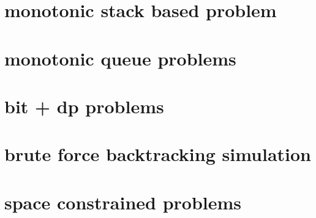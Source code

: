 \chapter{monotonic stack based problem}
\chapter{monotonic queue problems}
\chapter{bit + dp problems}
\chapter{brute force backtracking simulation}
\chapter{space constrained problems}

